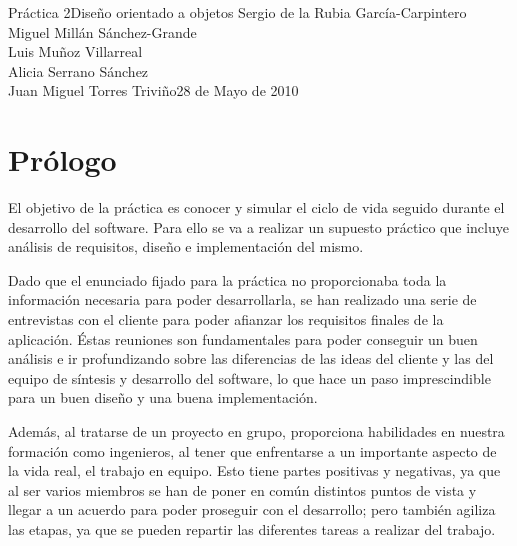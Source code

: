\documentclass[11pt,a4paper,spanish,twoside]{book}
\begin{document}


{Práctica 2}{Diseño orientado a objetos}
{Sergio de la Rubia García-Carpintero\\Miguel Millán Sánchez-Grande\\
  Luis Muñoz Villarreal\\Alicia Serrano Sánchez\\
  Juan Miguel Torres Triviño}{28 de Mayo de 2010}


\tableofcontents

\chapter*{Prólogo}
El objetivo de la práctica es conocer y simular el ciclo de vida seguido
durante el desarrollo del software. Para ello se va a realizar un supuesto
práctico que incluye análisis de requisitos, diseño e implementación del
mismo. 

Dado que el enunciado fijado para la práctica no proporcionaba toda la
información necesaria para poder desarrollarla, se han realizado
una serie de entrevistas con el cliente para poder afianzar los requisitos
finales de la aplicación. Éstas reuniones son fundamentales para poder
conseguir un buen análisis e ir profundizando sobre las diferencias de las
ideas del cliente y las del equipo de síntesis y desarrollo del software, lo
que hace un paso imprescindible para un buen diseño y una buena implementación.

Además, al tratarse de un proyecto en grupo, proporciona habilidades en
nuestra formación como ingenieros, al tener que enfrentarse a un importante
aspecto de la vida real, el trabajo en equipo. Esto tiene partes positivas y
negativas, ya que al ser varios miembros se han de poner en común distintos
puntos de vista y llegar a un acuerdo para poder proseguir con el desarrollo;
pero también agiliza las etapas, ya que se pueden repartir las diferentes
tareas a realizar del trabajo. 
\end{document}
